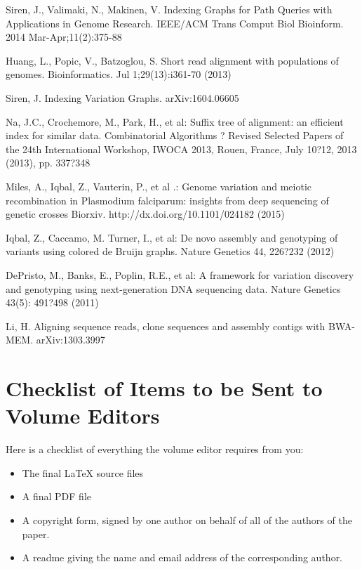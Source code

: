 \documentclass[runningheads,a4paper]{llncs}
\begin{document}
\begin{thebibliography}{4}
 Siren, J., Valimaki, N., Makinen, V. Indexing Graphs for Path Queries with Applications in Genome Research. IEEE/ACM Trans Comput Biol Bioinform. 2014 Mar-Apr;11(2):375-88

 Huang, L., Popic, V., Batzoglou, S. Short read alignment with populations of genomes. Bioinformatics. Jul 1;29(13):i361-70 (2013)

 Siren, J. Indexing Variation Graphs. 	arXiv:1604.06605 

 Na, J.C., Crochemore, M., Park, H.,  et al: Suffix tree of alignment: an efficient index for similar data. Combinatorial Algorithms ? Revised Selected Papers of the 24th International Workshop, IWOCA 2013, Rouen, France, July 10?12, 2013 (2013), pp. 337?348

 Miles, A., Iqbal, Z., Vauterin, P., et al .: Genome variation and meiotic recombination in Plasmodium falciparum: insights from deep sequencing of genetic crosses Biorxiv. http://dx.doi.org/10.1101/024182 (2015)

 Iqbal, Z., Caccamo, M. Turner, I.,  et al: De novo assembly and genotyping of variants using colored de Bruijn graphs. Nature Genetics  44, 226?232 (2012)

 DePristo, M., Banks, E., Poplin, R.E., et al: A framework for variation discovery and genotyping using next-generation DNA sequencing data. Nature Genetics 43(5): 491?498 (2011)

 Li, H. Aligning sequence reads, clone sequences and assembly contigs with BWA-MEM. 	arXiv:1303.3997


\end{thebibliography}


\section{Checklist of Items to be Sent to Volume Editors}
Here is a checklist of everything the volume editor requires from you:


\begin{itemize}
\settowidth{\leftmargin}{{\Large$\square$}}\advance\leftmargin{}
\itemsep8pt\relax
\renewcommand\labelitemi{{\lower1.5pt\hbox{\Large$\square$}}}

\item The final \LaTeX{} source files
\item A final PDF file
\item A copyright form, signed by one author on behalf of all of the
authors of the paper.
\item A readme giving the name and email address of the
corresponding author.
\end{itemize}
\end{document}
